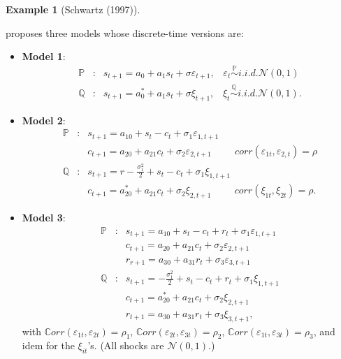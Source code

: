 \documentclass[
  12pt,
]{book}
\providecommand{\tightlist}{%
  \setlength{\itemsep}{0pt}\setlength{\parskip}{0pt}}
\theoremstyle{definition}
\theoremstyle{definition}
\newtheorem{example}{Example}[chapter]
\theoremstyle{definition}
\theoremstyle{definition}
\theoremstyle{remark}
\begin{document}
\begin{example}[Schwartz (1997)]
\protect\hypertarget{exm:Schwartz1997}{}\label{exm:Schwartz1997}

\citet{Schwartz_1997} proposes three models whose discrete-time versions are:

\begin{itemize}
\tightlist
\item
  \textbf{Model 1}:
  \begin{eqnarray*}
  \mathbb{P}&:& s_{t+1} = a_0 + a_1 s_t + \sigma \varepsilon_{t+1}, \; \; \; \varepsilon_t \stackrel{\mathbb{P}}{\sim}  i.i.d. \mathcal{N}(0,1) \\
  \mathbb{Q} &:& s_{t+1} = a^*_0 + a_1 s_t + \sigma \xi_{t+1}, \; \; \; \xi_{t} \stackrel{\mathbb{Q}}{\sim}  i.i.d. \mathcal{N}(0,1).
  \end{eqnarray*}
\item
  \textbf{Model 2}:
  \begin{eqnarray*}
  \mathbb{P}&:& s_{t+1} = a_{10} + s_t - c_t + \sigma_1 \varepsilon_{1,t+1}\\
  && c_{t+1} = a_{20} + a_{21} c_t + \sigma_2 \varepsilon_{2,t+1}\hspace{1cm} corr (\varepsilon_{1t}, \varepsilon_{2,t}) = \rho \\
  \mathbb{Q}&:& s_{t+1} = r - \frac{\sigma^2_1}{2} + s_t - c_t + \sigma_1  \xi_{1,t+1} \\
  && c_{t+1} = a^*_{20} + a_{21} c_t + \sigma_2 \xi_{2,t+1} \hspace{1cm} corr (\xi_{1t}, \xi_{2t}) = \rho.
  \end{eqnarray*}
\item
  \textbf{Model 3}:
  \begin{eqnarray*}
  \mathbb{P}&:& s_{t+1} = a_{10} + s_t - c_t + r_t + \sigma_1 \varepsilon_{1,t+1} \\
  && c_{t+1}= a_{20} + a_{21} c_t + \sigma_2 \varepsilon_{2,t+1} \\
  && r_{r+1} = a_{30} + a_{31} r_t + \sigma_3 \varepsilon_{3,t+1} \\
  \mathbb{Q}&:& s_{t+1} = -\frac{\sigma^2_1}{2} + s_t - c_t + r_t + \sigma_1 \xi_{1,t+1}\\
  &&c_{t+1} = a^*_{20} + a_{21} c_t + \sigma_2 \xi_{2,t+1} \\
  &&r_{t+1} = a_{30} + a_{31} r_t + \sigma_3 \xi_{3,t+1},
  \end{eqnarray*}
  with \(\mathbb{C}orr(\varepsilon_{1t}, \varepsilon_{2t}) = \rho_1\), \(\mathbb{C}orr(\varepsilon_{2t}, \varepsilon_{3t}) = \rho_2\), \(\mathbb{C}orr(\varepsilon_{1t}, \varepsilon_{3t}) = \rho_3\), and idem for the \(\xi_{it}\)'s. (All shocks are \(\mathcal{N}(0,1)\).)
\end{itemize}


\end{example}
\end{document}

